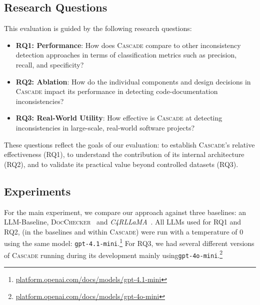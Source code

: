 \documentclass[acmsmall, screen]{acmart}
\newcommand{\tool}{\textsc{Cascade}\xspace}
\begin{document}
\subsection{Research Questions}
This evaluation is guided by the following research questions:
\begin{itemize}
    \item \textbf{RQ1: Performance}: How does \tool compare to other inconsistency detection approaches in terms of classification metrics such as precision, recall, and specificity?
    \item \textbf{RQ2: Ablation}: How do the individual components and design decisions in \tool impact its performance in detecting code-documentation inconsistencies?
    \item \textbf{RQ3: Real-World Utility}: How effective is \tool at detecting inconsistencies in large-scale, real-world software projects?
\end{itemize}
These questions reflect the goals of our evaluation: to establish \tool's relative effectiveness (RQ1), to understand the contribution of its internal architecture (RQ2), and to validate its practical value beyond controlled datasets (RQ3).

\subsection{Experiments}
For the main experiment, we compare our approach against three baselines: an LLM-Baseline, \textsc{DocChecker}~\cite{docchecker} and \textit{C4RLLaMA}~\cite{carlama}. All LLMs used for RQ1 and RQ2, (in the baselines and within \tool) were run with a temperature of 0 using the same model: \texttt{gpt-4.1-mini}.\footnote{\href{https://platform.openai.com/docs/models/gpt-4.1-mini}{platform.openai.com/docs/models/gpt-4.1-mini}} 
For RQ3, we had several different versions of \tool running during its development mainly using\texttt{gpt-4o-mini}.\footnote{\href{https://platform.openai.com/docs/models/gpt-4o-mini}{platform.openai.com/docs/models/gpt-4o-mini}}
\end{document}
